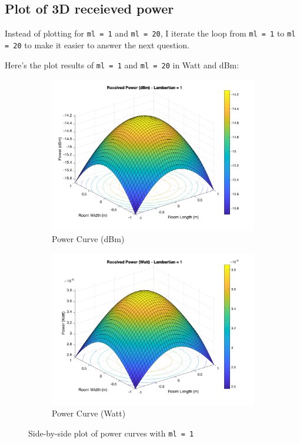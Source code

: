 \documentclass[12pt]{article}
\begin{document}
    \subsection{Plot of 3D receieved power}
    Instead of plotting for \texttt{ml = 1} and \texttt{ml = 20}, I iterate the loop from \texttt{ml = 1} to \texttt{ml = 20} to make it easier to answer the next question.

    Here's the plot results of \texttt{ml = 1} and \texttt{ml = 20} in Watt and dBm:

    \begin{figure}[htbp]
        \centering
        \begin{subfigure}[b]{0.45\textwidth}
            \includegraphics[width=\textwidth]{images/3D_power_curve_dBm_1.png}
            \caption{Power Curve (dBm)}
            \label{fig:power_curve_dBm}
        \end{subfigure}
        \hfill
        \begin{subfigure}[b]{0.45\textwidth}
            \includegraphics[width=\textwidth]{images/3D_power_curve_Watt_1.png}
            \caption{Power Curve (Watt)}
            \label{fig:power_curve_Watt}
        \end{subfigure}
        \caption{Side-by-side plot of power curves with \texttt{ml = 1}}
        \label{fig:power_curves}
    \end{figure}
\end{document}
